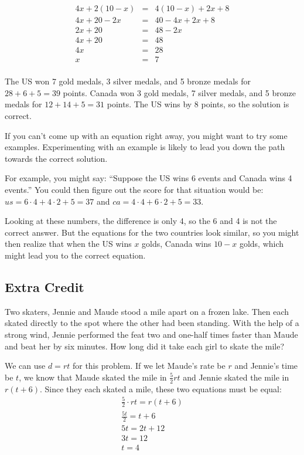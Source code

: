 \documentclass[fleqn,addpoints]{exam}
\begin{document}
\begin{questions}
\begin{solution}[5 cm]
\begin{eqnarray*}
  4x + 2(10 - x) &=& 4(10 - x) + 2x + 8\\
  4x + 20 - 2x   &=& 40 - 4x + 2x + 8\\
  2x + 20        &=& 48 - 2x \\
  4x + 20        &=& 48 \\
  4x             &=& 28 \\
  x              &=& 7 \\
\end{eqnarray*}

The US won 7 gold medals, 3 silver medals, and 5 bronze medals for \(28 + 6 + 5 = 39 \) points.  Canada won 3 gold
medals, 7 silver medals, and 5 bronze medals for \( 12 + 14 + 5 = 31 \) points.  The US wins by 8 points, so the
solution is correct.

If you can't come up with an equation right away, you might want to try some examples.  Experimenting with an example is
likely to lead you down the path towards the correct solution.

For example, you might say:  ``Suppose the US wins 6 events and Canada wins 4 events.''  You could then figure out the
score for that situation would be: \( us = 6 \cdot 4 + 4 \cdot 2 + 5 = 37 \) and 
\( ca = 4 \cdot 4 + 6 \cdot 2 + 5 = 33 \).

Looking at these numbers, the difference is only 4, so the 6 and 4 is not the correct answer.  But the equations for the
two countries look similar, so you might then realize that when the US wins $x$ golds, Canada wins $10 - x$ golds, which
might lead you to the correct equation.
 
\end{solution}

\pagebreak

\subsection{Extra Credit}

\noaddpoints

\question[5]
Two skaters, Jennie and Maude stood a mile apart on a frozen lake.  Then each skated directly to the spot where
the other had been standing.  With the help of a strong wind, Jennie performed the feat two and one-half times faster
than Maude and beat her by six minutes.  How long did it take each girl to skate the mile?

\begin{solution}[5 cm]
We can use $d = rt$ for this problem.  If we let Maude's rate be $r$ and Jennie's time be $t$, we know that Maude skated
the mile in $\frac{5}{2} rt$ and Jennie skated the mile in $r(t + 6)$.  Since they each skated a mile, these two equations must
be equal:
\begin{eqnarray*}
  \frac{5}{2} \cdot rt = r(t + 6) \\
  \frac{5t}{2} = t + 6 \\
  5t = 2t + 12 \\
  3t = 12 \\
  t = 4 \\
\end{eqnarray*}


\end{solution}
\end{questions}
\end{document}
